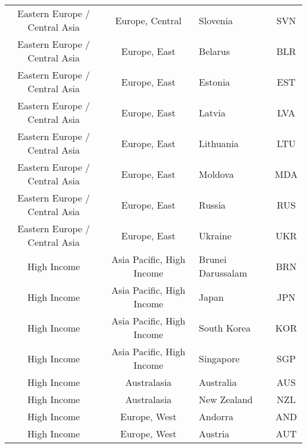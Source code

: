 \begin{landscape}
\begin{longtable}{|c|c|p{5cm}|c|}
 Eastern Europe / Central Asia &              Europe, Central &                                          Slovenia &  SVN \\
 Eastern Europe / Central Asia &                 Europe, East &                                           Belarus &  BLR \\
 Eastern Europe / Central Asia &                 Europe, East &                                           Estonia &  EST \\
 Eastern Europe / Central Asia &                 Europe, East &                                            Latvia &  LVA \\
 Eastern Europe / Central Asia &                 Europe, East &                                         Lithuania &  LTU \\
 Eastern Europe / Central Asia &                 Europe, East &                                           Moldova &  MDA \\
 Eastern Europe / Central Asia &                 Europe, East &                                            Russia &  RUS \\
 Eastern Europe / Central Asia &                 Europe, East &                                           Ukraine &  UKR \\
                   High Income &    Asia Pacific, High Income &                                 Brunei Darussalam &  BRN \\
                   High Income &    Asia Pacific, High Income &                                             Japan &  JPN \\
                   High Income &    Asia Pacific, High Income &                                       South Korea &  KOR \\
                   High Income &    Asia Pacific, High Income &                                         Singapore &  SGP \\
                   High Income &                  Australasia &                                         Australia &  AUS \\
                   High Income &                  Australasia &                                       New Zealand &  NZL \\
                   High Income &                 Europe, West &                                           Andorra &  AND \\
                   High Income &                 Europe, West &                                           Austria &  AUT \\

\end{longtable}
\end{landscape}
